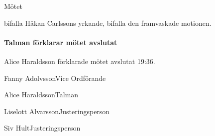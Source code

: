 \documentclass{dsekminutes}
\begin{document}
Mötet 
\begin{attlist}
  \att bifalla Håkan Carlssons yrkande,
  \att bifalla den framvaskade motionen.
\end{attlist}

\paragraph{Talman förklarar mötet avslutat}
Alice Haraldsson förklarade mötet avslutat 19:36.

\vspace{5cm}

\endparagraphed %

\signature{Vid protokollet}{Fanny Adolvsson}{Vice Ordförande}
\signature{Mötesordförande}{Alice Haraldsson}{Talman}
\signature{Justeras}{Liselott Alvarsson}{Justeringsperson}
\signature{Justeras}{Siv Hult}{Justeringsperson}
\end{document}
